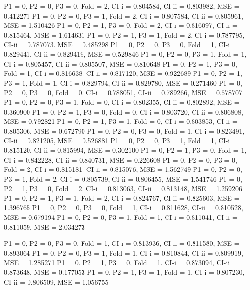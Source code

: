 P1 = 0,  P2 = 0, P3 = 0, Fold = 2, CI-i = 0.804584, CI-ii = 0.803982, MSE = 0.412271
P1 = 0,  P2 = 0, P3 = 1, Fold = 2, CI-i = 0.807584, CI-ii = 0.805961, MSE = 1.510426
P1 = 0,  P2 = 1, P3 = 0, Fold = 2, CI-i = 0.816097, CI-ii = 0.815464, MSE = 1.614631
P1 = 0,  P2 = 1, P3 = 1, Fold = 2, CI-i = 0.787795, CI-ii = 0.787073, MSE = 0.485298
P1 = 0,  P2 = 0, P3 = 0, Fold = 1, CI-i = 0.829441, CI-ii = 0.829419, MSE = 0.529846
P1 = 0,  P2 = 0, P3 = 1, Fold = 1, CI-i = 0.805457, CI-ii = 0.805507, MSE = 0.810648
P1 = 0,  P2 = 1, P3 = 0, Fold = 1, CI-i = 0.816638, CI-ii = 0.817120, MSE = 0.922689
P1 = 0,  P2 = 1, P3 = 1, Fold = 1, CI-i = 0.829794, CI-ii = 0.829780, MSE = 0.271460
P1 = 0,  P2 = 0, P3 = 0, Fold = 0, CI-i = 0.788051, CI-ii = 0.789266, MSE = 0.678707
P1 = 0,  P2 = 0, P3 = 1, Fold = 0, CI-i = 0.802355, CI-ii = 0.802892, MSE = 0.360900
P1 = 0,  P2 = 1, P3 = 0, Fold = 0, CI-i = 0.803720, CI-ii = 0.806808, MSE = 0.792821
P1 = 0,  P2 = 1, P3 = 1, Fold = 0, CI-i = 0.803853, CI-ii = 0.805306, MSE = 0.672790
P1 = 0,  P2 = 0, P3 = 0, Fold = 1, CI-i = 0.823491, CI-ii = 0.821205, MSE = 0.526881
P1 = 0,  P2 = 0, P3 = 1, Fold = 1, CI-i = 0.815120, CI-ii = 0.815994, MSE = 0.302100
P1 = 0,  P2 = 1, P3 = 0, Fold = 1, CI-i = 0.842228, CI-ii = 0.840731, MSE = 0.226608
P1 = 0,  P2 = 0, P3 = 0, Fold = 2, CI-i = 0.815181, CI-ii = 0.815076, MSE = 1.562749
P1 = 0,  P2 = 0, P3 = 1, Fold = 2, CI-i = 0.805739, CI-ii = 0.806455, MSE = 1.541746
P1 = 0,  P2 = 1, P3 = 0, Fold = 2, CI-i = 0.813063, CI-ii = 0.813148, MSE = 1.259206
P1 = 0,  P2 = 1, P3 = 1, Fold = 2, CI-i = 0.824767, CI-ii = 0.825603, MSE = 1.396765
P1 = 0,  P2 = 0, P3 = 0, Fold = 1, CI-i = 0.811628, CI-ii = 0.810528, MSE = 0.679194
P1 = 0,  P2 = 0, P3 = 1, Fold = 1, CI-i = 0.811041, CI-ii = 0.811059, MSE = 2.034273

P1 = 0,  P2 = 0, P3 = 0, Fold = 1, CI-i = 0.813936, CI-ii = 0.811580, MSE = 0.893064
P1 = 0,  P2 = 0, P3 = 1, Fold = 1, CI-i = 0.810844, CI-ii = 0.809919, MSE = 1.285271
P1 = 0,  P2 = 1, P3 = 0, Fold = 1, CI-i = 0.873094, CI-ii = 0.873648, MSE = 0.177053
P1 = 0,  P2 = 1, P3 = 1, Fold = 1, CI-i = 0.807230, CI-ii = 0.806509, MSE = 1.056755
\fi
